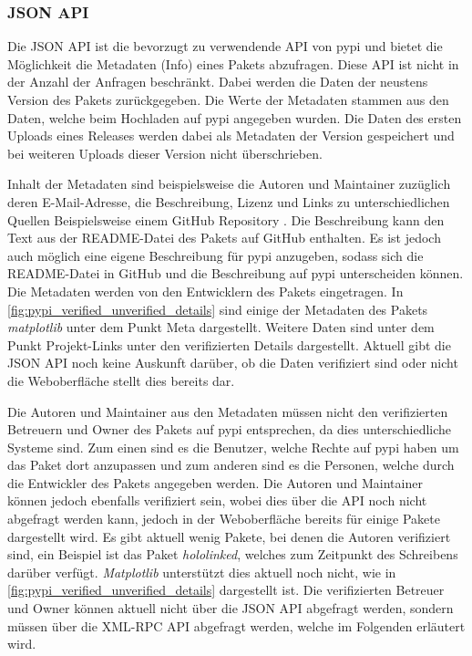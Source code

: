\subsubsection*{JSON API}
\label{subsubsec:pypi_json_api}
Die JSON API ist die bevorzugt zu verwendende API von \gls{pypi} und bietet die Möglichkeit die Metadaten (Info) eines Pakets abzufragen.
Diese API ist nicht in der Anzahl der Anfragen beschränkt.
Dabei werden die Daten der neustens Version des Pakets zurückgegeben.
Die Werte der Metadaten stammen aus den Daten, welche beim Hochladen auf \gls{pypi} angegeben wurden.
Die Daten des ersten Uploads eines Releases werden dabei als Metadaten der Version gespeichert und bei weiteren Uploads dieser Version nicht überschrieben.

Inhalt der Metadaten sind beispielsweise die Autoren und Maintainer zuzüglich deren E-Mail-Adresse, die Beschreibung, Lizenz und Links zu unterschiedlichen Quellen Beispielsweise einem GitHub Repository \autocite{python_software_foundation_warehouse_2024}.
Die Beschreibung kann den Text aus der README-Datei des Pakets auf GitHub enthalten.
Es ist jedoch auch möglich eine eigene Beschreibung für \gls{pypi} anzugeben, sodass sich die README-Datei in GitHub und die Beschreibung auf \gls{pypi} unterscheiden können.
Die Metadaten werden von den Entwicklern des Pakets eingetragen.
In \autoref{fig:pypi_verified_unverified_details} sind einige der Metadaten des Pakets \emph{matplotlib} unter dem Punkt \glqq Meta\grqq{} dargestellt.
Weitere Daten sind unter dem Punkt \glqq Projekt-Links\grqq{} unter den verifizierten Details dargestellt.
Aktuell gibt die JSON API noch keine Auskunft darüber, ob die Daten verifiziert sind oder nicht die Weboberfläche stellt dies bereits dar.

Die Autoren und Maintainer aus den Metadaten müssen nicht den verifizierten Betreuern und Owner des Pakets auf \gls{pypi} entsprechen, da dies unterschiedliche Systeme sind.
Zum einen sind es die Benutzer, welche Rechte auf \gls{pypi} haben um das Paket dort anzupassen und zum anderen sind es die Personen, welche durch die Entwickler des Pakets angegeben werden.
Die Autoren und Maintainer können jedoch ebenfalls verifiziert sein, wobei dies über die API noch nicht abgefragt werden kann, jedoch in der Weboberfläche bereits für einige Pakete dargestellt wird.
Es gibt aktuell wenig Pakete, bei denen die Autoren verifiziert sind, ein Beispiel ist das Paket \emph{hololinked}, welches zum Zeitpunkt des Schreibens darüber verfügt.
\emph{Matplotlib} unterstützt dies aktuell noch nicht, wie in \autoref{fig:pypi_verified_unverified_details} dargestellt ist.
Die verifizierten Betreuer und Owner können aktuell nicht über die JSON API abgefragt werden, sondern müssen über die XML-RPC API abgefragt werden, welche im Folgenden erläutert wird.

